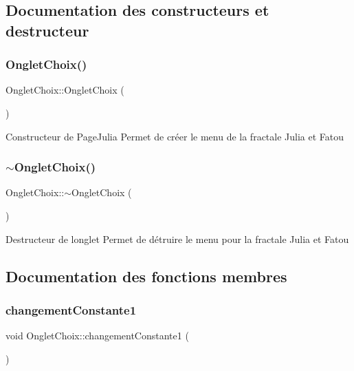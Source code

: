 \subsection{Documentation des constructeurs et destructeur}
\mbox{\label{classOngletChoix_a9045157d6876f0259e8282c34d00bbe1}} 
\subsubsection{\texorpdfstring{Onglet\+Choix()}{OngletChoix()}}
{\footnotesize\ttfamily Onglet\+Choix\+::\+Onglet\+Choix (\begin{DoxyParamCaption}{ }\end{DoxyParamCaption})}

Constructeur de Page\+Julia Permet de créer le menu de la fractale Julia et Fatou \mbox{\label{classOngletChoix_ad309587d49a904c8def659b733862085}} 
\subsubsection{\texorpdfstring{$\sim$\+Onglet\+Choix()}{~OngletChoix()}}
{\footnotesize\ttfamily Onglet\+Choix\+::$\sim$\+Onglet\+Choix (\begin{DoxyParamCaption}{ }\end{DoxyParamCaption})}

Destructeur de l\textquotesingle{}onglet Permet de détruire le menu pour la fractale Julia et Fatou 

\subsection{Documentation des fonctions membres}
\mbox{\label{classOngletChoix_a64dcaf259b31c0f0cbe913f3aaa5c501}} 
\subsubsection{\texorpdfstring{changement\+Constante1}{changementConstante1}}
{\footnotesize\ttfamily void Onglet\+Choix\+::changement\+Constante1 (\begin{DoxyParamCaption}{ }\end{DoxyParamCaption})\hspace{0.3cm}{\ttfamily [slot]}}

